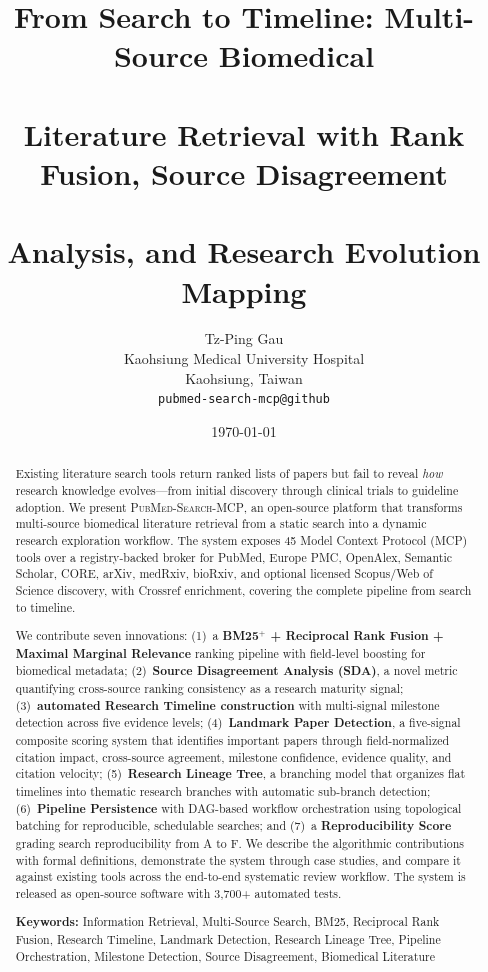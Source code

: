 \documentclass[11pt,a4paper]{article}
\title{
    \textbf{From Search to Timeline: Multi-Source Biomedical \\\\
    Literature Retrieval with Rank Fusion, Source Disagreement \\\\
    Analysis, and Research Evolution Mapping}
}
\author{
    Tz-Ping Gau \\
    Kaohsiung Medical University Hospital \\
    Kaohsiung, Taiwan \\
    \texttt{pubmed-search-mcp@github}
}
\date{\today}
\newcommand{\system}{\textsc{PubMed-Search-MCP}}
\begin{document}
\maketitle

\begin{abstract}
Existing literature search tools return ranked lists of papers but fail to reveal \emph{how} research knowledge evolves---from initial discovery through clinical trials to guideline adoption.
We present \system{}, an open-source platform that transforms multi-source biomedical literature retrieval from a static search into a dynamic research exploration workflow.
The system exposes 45 Model Context Protocol (MCP) tools over a registry-backed broker for PubMed, Europe PMC, OpenAlex, Semantic Scholar, CORE, arXiv, medRxiv, bioRxiv, and optional licensed Scopus/Web of Science discovery, with Crossref enrichment, covering the complete pipeline from search to timeline.

We contribute seven innovations:
(1)~a \textbf{BM25$^{+}$ + Reciprocal Rank Fusion + Maximal Marginal Relevance} ranking pipeline with field-level boosting for biomedical metadata;
(2)~\textbf{Source Disagreement Analysis (SDA)}, a novel metric quantifying cross-source ranking consistency as a research maturity signal;
(3)~\textbf{automated Research Timeline construction} with multi-signal milestone detection across five evidence levels;
(4)~\textbf{Landmark Paper Detection}, a five-signal composite scoring system that identifies important papers through field-normalized citation impact, cross-source agreement, milestone confidence, evidence quality, and citation velocity;
(5)~\textbf{Research Lineage Tree}, a branching model that organizes flat timelines into thematic research branches with automatic sub-branch detection;
(6)~\textbf{Pipeline Persistence} with DAG-based workflow orchestration using topological batching for reproducible, schedulable searches;
and (7)~a \textbf{Reproducibility Score} grading search reproducibility from A to F.
We describe the algorithmic contributions with formal definitions, demonstrate the system through case studies, and compare it against existing tools across the end-to-end systematic review workflow.
The system is released as open-source software with 3{,}700+ automated tests.

\medskip
\noindent\textbf{Keywords:} Information Retrieval, Multi-Source Search, BM25, Reciprocal Rank Fusion, Research Timeline, Landmark Detection, Research Lineage Tree, Pipeline Orchestration, Milestone Detection, Source Disagreement, Biomedical Literature
\end{abstract}
\end{document}
